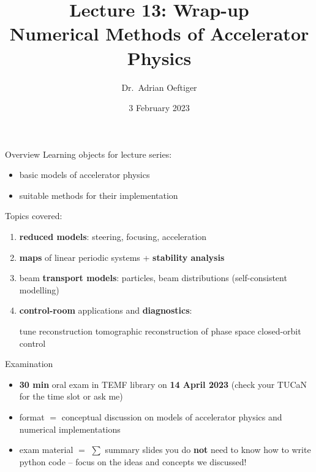 \documentclass[a4paper,graphics,t]{beamer} %
\title{\texorpdfstring{%
    Lecture 13: Wrap-up \\[0.3em] Numerical Methods of \break Accelerator Physics %
    }{%
        Lecture 13: Wrap-up Numerical Methods of Accelerator Physics%
    }%
}
\subtitle{\texorpdfstring{%
        \normalfont{Dr.\ Adrian Oeftiger}%
    }{}%
}
\date{3 February 2023}
\author{Dr.\ Adrian Oeftiger}
\begin{document}
\begin{frame}[noframenumbering]{}
    \titlepage
\end{frame}

\begin{frame}[c]{Overview}
    Learning objects for lecture series:
    \begin{itemize}
        \item basic models of accelerator physics
        \item suitable methods for their implementation
    \end{itemize}
    \vspace{1em}
    Topics covered:
    \begin{enumerate}
        \item \textbf{reduced models}: steering, focusing, acceleration
        \item \textbf{maps} of linear periodic systems + \textbf{stability analysis}
        \item beam \textbf{transport models}: particles, beam distributions (self-consistent modelling)
        \item \textbf{control-room} applications and \textbf{diagnostics}:
        \begin{itemize}
            \see tune reconstruction
            \see tomographic reconstruction of phase space
            \see closed-orbit control
        \end{itemize}
    \end{enumerate}
\end{frame}

\begin{frame}{Examination}
    \begin{itemize}
        \item \textbf{30 min} oral exam in TEMF library on \textbf{14 April 2023} \break (check your TUCaN for the time slot or ask me)
        \item format $=$ conceptual discussion on models of accelerator physics and numerical implementations
        \item exam material $=$ $\sum$ summary slides
        \attention you do \textbf{not} need to know how to write python code -- \break focus on the ideas and concepts we discussed!
    \end{itemize}
\end{frame}
\end{document}
